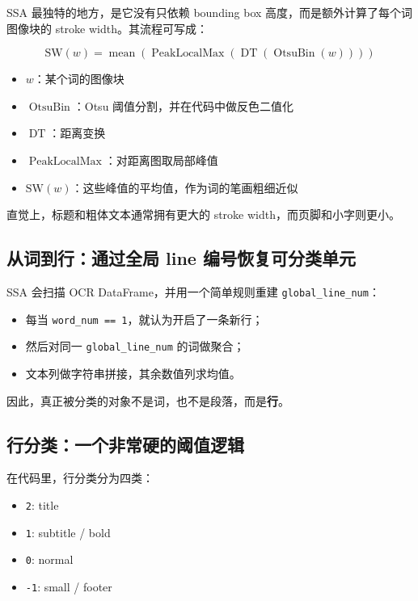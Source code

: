 \documentclass[a4paper]{article}
\begin{document}
SSA 最独特的地方，是它没有只依赖 bounding box 高度，而是额外计算了每个词图像块的 stroke width。其流程可写成：

$$
\text{SW}(w) = \operatorname{mean}\left(\operatorname{PeakLocalMax}\left(\operatorname{DT}\left(\operatorname{OtsuBin}(w)\right)\right)\right)
$$

\begin{itemize}
\item $w$：某个词的图像块
\item $\operatorname{OtsuBin}$：Otsu 阈值分割，并在代码中做反色二值化
\item $\operatorname{DT}$：距离变换
\item $\operatorname{PeakLocalMax}$：对距离图取局部峰值
\item $\text{SW}(w)$：这些峰值的平均值，作为词的笔画粗细近似
\end{itemize}

直觉上，标题和粗体文本通常拥有更大的 stroke width，而页脚和小字则更小。

\subsection{从词到行：通过全局 line 编号恢复可分类单元}

SSA 会扫描 OCR DataFrame，并用一个简单规则重建 \texttt{global\_line\_num}：

\begin{itemize}
\item 每当 \texttt{word\_num == 1}，就认为开启了一条新行；
\item 然后对同一 \texttt{global\_line\_num} 的词做聚合；
\item 文本列做字符串拼接，其余数值列求均值。
\end{itemize}

因此，真正被分类的对象不是词，也不是段落，而是\textbf{行}。

\subsection{行分类：一个非常硬的阈值逻辑}

在代码里，行分类分为四类：

\begin{itemize}
\item \texttt{2}: title
\item \texttt{1}: subtitle / bold
\item \texttt{0}: normal
\item \texttt{-1}: small / footer
\end{itemize}
\end{document}
